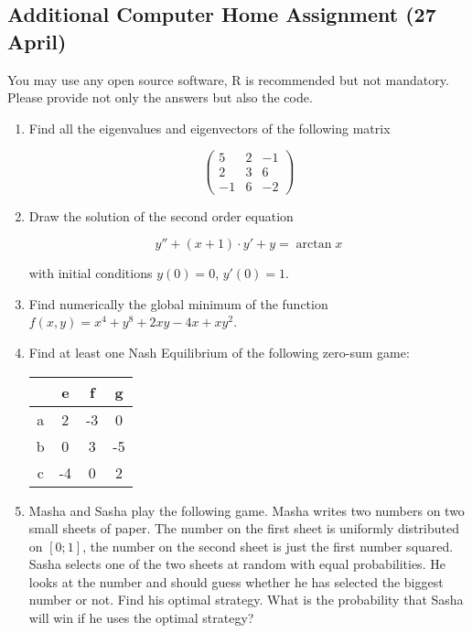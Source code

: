 \documentclass[a4paper]{article}
\begin{document}
\newpage
\subsection*{Additional Computer Home Assignment (27 April)}

You may use any open source software, R is recommended but not mandatory. Please provide not only the answers but also the code.  

\begin{enumerate}

\item Find all the eigenvalues and eigenvectors of the following matrix

\[
\begin{pmatrix}
5 & 2 & -1\\
2 & 3 & 6\\
-1 & 6 & -2
\end{pmatrix}
\]

\item Draw the solution of the second order equation

\[
y''+(x+1)\cdot y' + y=\arctan x
\]

with initial conditions $y(0)=0$, $y'(0)=1$.

\item Find numerically the global minimum of the function $f(x,y)=x^4+y^8+2xy-4x+xy^2$.

\item Find at least one Nash Equilibrium of the following zero-sum game:

\begin{tabular}{c|ccc}
 & e & f & g \\ 
\hline 
a & 2 & -3 & 0 \\ 
b & 0 & 3 & -5 \\ 
c & -4 & 0 & 2 \\ 
\end{tabular} 

\item Masha and Sasha play the following game. Masha writes two numbers on two small sheets of paper. The number on the first sheet is uniformly distributed on $[0;1]$, the number on the second sheet is just the first number squared. Sasha selects one of the two sheets at random with equal probabilities. He looks at the number and should guess whether he has selected the biggest number or not. Find his optimal strategy. What is the probability that Sasha will win if he uses the optimal strategy?

\end{enumerate}
\end{document}
